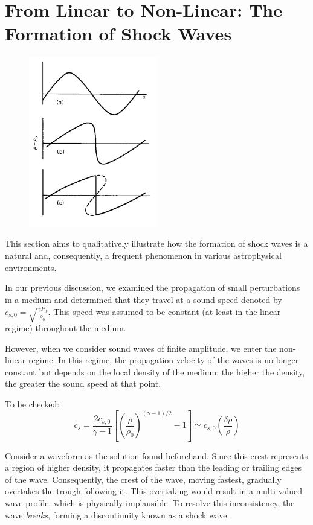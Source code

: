 \section{From Linear to Non-Linear: The Formation of Shock Waves}

\begin{figure}[!t]
\centering
\includegraphics[width=0.5\textwidth]{figures/shocklandau.pdf}
\caption{}
\end{figure}

This section aims to qualitatively illustrate how the formation of shock waves is a natural and, consequently, a frequent phenomenon in various astrophysical environments.

In our previous discussion, we examined the propagation of small perturbations in a medium and determined that they travel at a sound speed denoted by \( c_{s,0} = \sqrt{ \frac{\gamma P_0}{\rho_0}} \). This speed was assumed to be constant (at least in the linear regime) throughout the medium.

However, when we consider sound waves of finite amplitude, we enter the non-linear regime. In this regime, the propagation velocity of the waves is no longer constant but depends on the local density of the medium: the higher the density, the greater the sound speed at that point.


To be checked: \[ c_s = \frac{2 c_{s,0}}{\gamma - 1} \left[ \left( \frac{\rho}{\rho_0} \right)^{(\gamma-1)/2} -1 \right] \simeq c_{s,0} \left( \frac{\delta \rho}{\rho} \right) \]

Consider a waveform as the solution found beforehand. Since this crest represents a region of higher density, it propagates faster than the leading or trailing edges of the wave. Consequently, the crest of the wave, moving fastest, gradually overtakes the trough following it. This overtaking would result in a multi-valued wave profile, which is physically implausible. To resolve this inconsistency, the wave \emph{breaks}, forming a discontinuity known as a shock wave.

